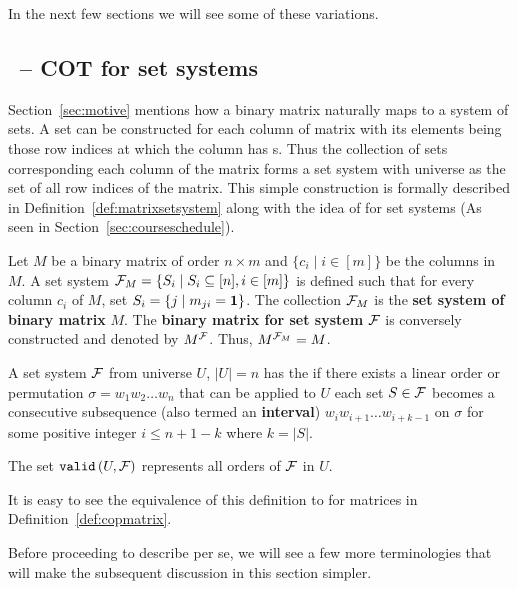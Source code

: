 In the next few sections we will see some of these variations.


\subsection{\PQRtree\ --  COT for set systems}
\label{sec:surveycertalgo}

Section~\ref{sec:motive} mentions how a binary matrix naturally maps
to a system of sets.  A set can be constructed for each column of
matrix with its elements being those row indices at which the column
has \un s. Thus the collection of sets corresponding each column of
the matrix forms a set system with universe as the set of all row
indices of the matrix.  This simple construction is formally described
in Definition~\ref{def:matrixsetsystem} along with the idea of \cop
for set systems (As seen in Section~\ref{sec:courseschedule}).

\begin{definition}%
  \label{def:matrixsetsystem}%
  Let $M$ be a binary matrix of order $n \times m$ and $\{c_i \mid i
  \in [m]\}$ be the columns in $M$.  A set system ${\cal F}_{M} = \{S_i
  \mid S_i \subseteq [n], i \in [m]\}$ is defined such that for every
  column $c_i$ of $M$, set $S_i = \{j \mid m_{ji} = \textbf{1} \}$. The
  collection ${\cal F}_M$ is the \textbf{set system of binary matrix} $M$. The
  \textbf{binary matrix for set system} ${\cal F}$ is conversely constructed
  and denoted by $M^{\cal F}$. Thus, $M^{{\cal F}_M} = M$.%
  \par\noindent%
  A set system ${\cal F}$ from universe $U$, $|U| = n$ has the \textbf{\cop}
  if there exists a linear order or permutation $\sigma = w_1w_2\ldots
  w_n$ that can be applied to $U$ \stt each set $S \in {\cal F}$ becomes a
  consecutive subsequence (also termed an \textbf{interval})
  $w_{i}w_{i+1}\ldots w_{i+k-1}$ on $\sigma$ for some positive integer
  $i \le n+1-k$ where $k = |S|$.
  \par\noindent%
  The set ${\tt valid}\left(U,{\cal F}\right)$ represents all \COP orders of ${\cal F}$ in $U$.
  \dstop
\end{definition}

It is easy to see the equivalence of this definition to \COP for
matrices in Definition~\ref{def:copmatrix}.

Before proceeding to describe \PQRtree per se, we will see a few more
terminologies that will make the subsequent discussion in this section
simpler.

